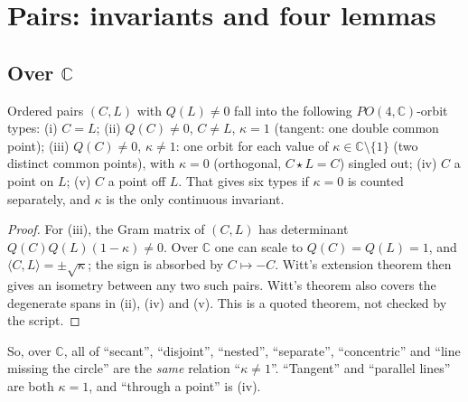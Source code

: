 \documentclass[11pt]{article}
\theoremstyle{definition}\newtheorem{definition}[theorem]{Definition}\newtheorem{remark}[theorem]{Remark}\newtheorem{example}[theorem]{Example}
\newcommand{\C}{\mathbb{C}}\newcommand{\R}{\mathbb{R}}\newcommand{\PP}{\mathbb{P}}
\newcommand{\ip}[2]{\langle #1,#2\rangle}\newcommand{\pt}{\mathrm{pt}}\newcommand{\Qd}{\mathcal{Q}}
\begin{document}
\section{Pairs: invariants and four lemmas}\label{sec:pairs}
\subsection{Over $\C$}
\begin{proposition}\label{prop:pairorbits}
Ordered pairs $(C,L)$ with $Q(L)\ne0$ fall into the following $PO(4,\C)$-orbit types:
(i) $C=L$;
(ii) $Q(C)\neq0$, $C\ne L$, $\kappa=1$ (tangent: one double common point);
(iii) $Q(C)\ne0$, $\kappa\ne1$: one orbit for each value of $\kappa\in\C\setminus\{1\}$ (two distinct common points), with $\kappa=0$ (orthogonal, $C\star L=C$) singled out;
(iv) $C$ a point on $L$;
(v) $C$ a point off $L$.
That gives six types if $\kappa=0$ is counted separately, and $\kappa$ is the only continuous invariant.
\end{proposition}
\begin{proof}
For (iii), the Gram matrix of $(C,L)$ has determinant $Q(C)Q(L)(1-\kappa)\ne0$. Over $\C$ one can scale to $Q(C)=Q(L)=1$, and $\ip CL=\pm\sqrt\kappa$; the sign is absorbed by $C\mapsto-C$. Witt's extension theorem \cite{Witt} then gives an isometry between any two such pairs. Witt's theorem also covers the degenerate spans in (ii), (iv) and (v). This is a quoted theorem, not checked by the script.
\end{proof}
So, over $\C$, all of ``secant'', ``disjoint'', ``nested'', ``separate'', ``concentric'' and ``line missing the circle'' are the \emph{same} relation ``$\kappa\ne1$''. ``Tangent'' and ``parallel lines'' are both $\kappa=1$, and ``through a point'' is (iv).
\end{document}
